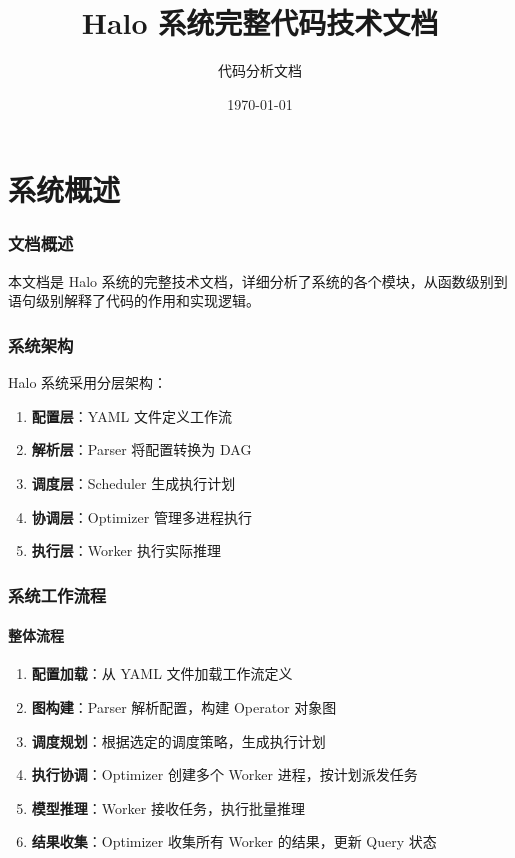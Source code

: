 \documentclass[12pt,a4paper]{article}
\title{Halo 系统完整代码技术文档}
\author{代码分析文档}
\date{\today}
\begin{document}
\maketitle

\tableofcontents
\newpage

\part{系统概述}

\section{文档概述}

本文档是 Halo 系统的完整技术文档，详细分析了系统的各个模块，从函数级别到语句级别解释了代码的作用和实现逻辑。

\section{系统架构}

Halo 系统采用分层架构：

\begin{enumerate}
    \item \textbf{配置层}：YAML 文件定义工作流
    \item \textbf{解析层}：Parser 将配置转换为 DAG
    \item \textbf{调度层}：Scheduler 生成执行计划
    \item \textbf{协调层}：Optimizer 管理多进程执行
    \item \textbf{执行层}：Worker 执行实际推理
\end{enumerate}

\section{系统工作流程}

\subsection{整体流程}

\begin{enumerate}
    \item \textbf{配置加载}：从 YAML 文件加载工作流定义
    \item \textbf{图构建}：Parser 解析配置，构建 Operator 对象图
    \item \textbf{调度规划}：根据选定的调度策略，生成执行计划
    \item \textbf{执行协调}：Optimizer 创建多个 Worker 进程，按计划派发任务
    \item \textbf{模型推理}：Worker 接收任务，执行批量推理
    \item \textbf{结果收集}：Optimizer 收集所有 Worker 的结果，更新 Query 状态
\end{enumerate}
\end{document}
